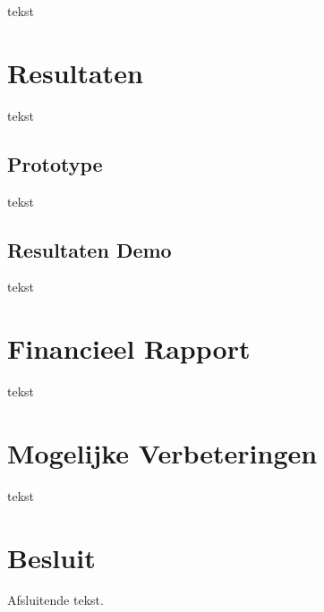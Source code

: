 \documentclass[kulak]{kulakarticle} %
\begin{document}
	tekst
	
	
	
	\section{Resultaten}
	
	tekst
	
	
	\subsection{Prototype}
	
	tekst
	
	
	\subsection{Resultaten Demo}
	
	tekst
	
	
	
	\section{Financieel Rapport}
	
	tekst
	
	
	
	\section{Mogelijke Verbeteringen}
	
	tekst
	
	
	
	\section*{Besluit}
	
	Afsluitende tekst.
	
	
	
	
	
	
	
	
\end{document}
